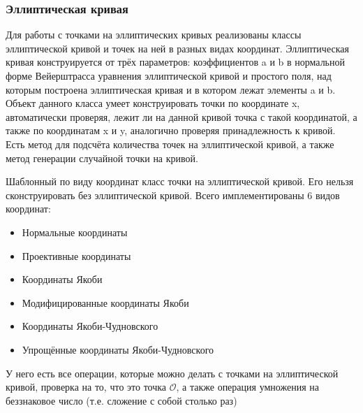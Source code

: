 \documentclass{article}
\begin{document}
\subsubsection{Эллиптическая кривая}
  Для работы с точками на эллиптических кривых реализованы классы эллиптической кривой и точек на ней в разных видах координат. Эллиптическая кривая конструируется от трёх параметров: коэффициентов a и b в нормальной форме Вейерштрасса уравнения эллиптической кривой и простого поля, над которым построена эллиптическая кривая и в котором лежат элементы a и b. Объект данного класса умеет конструировать точки по координате x, автоматически проверяя, лежит ли на данной кривой точка с такой координатой, а также по координатам x и y, аналогично проверяя принадлежность к кривой. Есть метод для подсчёта количества точек на эллиптической кривой, а также метод генерации случайной точки на кривой.

  Шаблонный по виду координат класс точки на эллиптической кривой. Его нельзя сконструировать без эллиптической кривой. Всего имплементированы 6 видов координат:
    \begin{itemize}
      \item Нормальные координаты
      \item Проективные координаты
      \item Координаты Якоби
      \item Модифицированные координаты Якоби
      \item Координаты Якоби-Чудновского
      \item Упрощённые координаты Якоби-Чудновского
    \end{itemize}
  У него есть все операции, которые можно делать с точками на эллиптической кривой, проверка на то, что это точка $\mathcal{O}$, а также операция умножения на беззнаковое число (т.е. сложение с собой столько раз)
\end{document}
